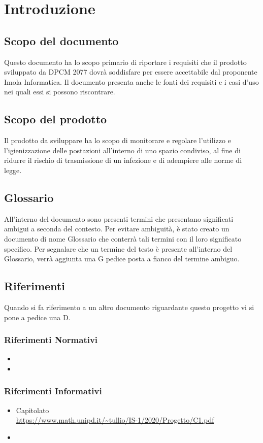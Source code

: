 \section{Introduzione}

\subsection{Scopo del documento}
Questo documento ha lo scopo primario di riportare i requisiti che il prodotto sviluppato da DPCM 2077 dovrà soddisfare per essere accettabile dal proponente Imola Informatica.
Il documento presenta anche le fonti dei requisiti e i casi d'uso nei quali essi si possono riscontrare.
\subsection{Scopo del prodotto}
Il prodotto da sviluppare ha lo scopo di monitorare e regolare l'utilizzo e l'igienizzazione delle postazioni all'interno di uno spazio condiviso, al fine di ridurre il rischio di trasmissione di un infezione e di adempiere alle norme di legge. 
\subsection{Glossario} 
All'interno del  documento sono presenti termini che presentano significati ambigui a seconda del contesto.
Per evitare ambiguità, è stato creato un  documento di nome Glossario che  conterrà tali termini con il loro significato specifico. Per segnalare che un termine del testo è presente all'interno del Glossario, verrà aggiunta una G pedice posta a fianco del termine ambiguo.
\subsection{Riferimenti}
Quando si fa riferimento a un altro documento riguardante questo progetto vi si pone a pedice una D.
\subsubsection{Riferimenti Normativi}
\begin{itemize}
	\item {}
	\item {}
\end{itemize}

\subsubsection{Riferimenti Informativi}
\begin{itemize}
	\item{Capitolato \\
		\url{https://www.math.unipd.it/~tullio/IS-1/2020/Progetto/C1.pdf}}
	\item {}
\end{itemize}